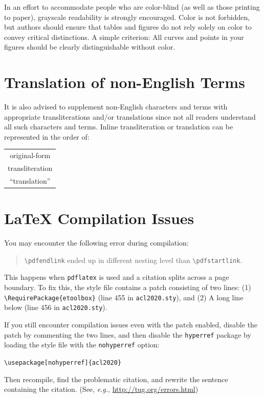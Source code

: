 \documentclass[11pt,a4paper]{article}
\begin{document}
In an effort to accommodate people who are color-blind (as well as those printing to paper), grayscale readability is strongly encouraged.
Color is not forbidden, but authors should ensure that tables and figures do not rely solely on color to convey critical distinctions.
A simple criterion:
All curves and points in your figures should be clearly distinguishable without color.

\section{Translation of non-English Terms}

It is also advised to supplement non-English characters and terms with appropriate transliterations and/or translations since not all readers understand all such characters and terms.
Inline transliteration or translation can be represented in the order of:
\begin{center}
\begin{tabular}{c}
original-form \\
transliteration \\
``translation''
\end{tabular}
\end{center}

\section{\LaTeX{} Compilation Issues}
You may encounter the following error during compilation: 
\begin{quote}
{\small\verb|\pdfendlink|} ended up in different nesting level than {\small\verb|\pdfstartlink|}.
\end{quote}
This happens when \texttt{\small pdflatex} is used and a citation splits across a page boundary.
To fix this, the style file contains a patch consisting of two lines:
(1) {\small\verb|\RequirePackage{etoolbox}|} (line 455 in \texttt{\small acl2020.sty}), and
(2) A long line below (line 456 in \texttt{\small acl2020.sty}).

If you still encounter compilation issues even with the patch enabled, disable the patch by commenting the two lines, and then disable the \texttt{\small hyperref} package by loading the style file with the \texttt{\small nohyperref} option:

\noindent
{\small\verb|\usepackage[nohyperref]{acl2020}|}

\noindent
Then recompile, find the problematic citation, and rewrite the sentence containing the citation. (See, {\em e.g.}, \url{http://tug.org/errors.html})
\end{document}
